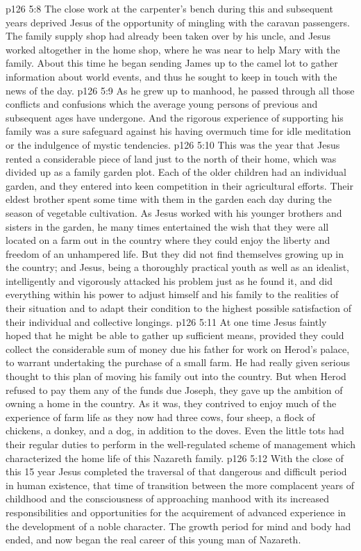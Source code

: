 \vs p126 5:8 The close work at the carpenter’s bench during this and subsequent years deprived Jesus of the opportunity of mingling with the caravan passengers. The family supply shop had already been taken over by his uncle, and Jesus worked altogether in the home shop, where he was near to help Mary with the family. About this time he began sending James up to the camel lot to gather information about world events, and thus he sought to keep in touch with the news of the day.
\vs p126 5:9 As he grew up to manhood, he passed through all those conflicts and confusions which the average young persons of previous and subsequent ages have undergone. And the rigorous experience of supporting his family was a sure safeguard against his having overmuch time for idle meditation or the indulgence of mystic tendencies.
\vs p126 5:10 \pc This was the year that Jesus rented a considerable piece of land just to the north of their home, which was divided up as a family garden plot. Each of the older children had an individual garden, and they entered into keen competition in their agricultural efforts. Their eldest brother spent some time with them in the garden each day during the season of vegetable cultivation. As Jesus worked with his younger brothers and sisters in the garden, he many times entertained the wish that they were all located on a farm out in the country where they could enjoy the liberty and freedom of an unhampered life. But they did not find themselves growing up in the country; and Jesus, being a thoroughly practical youth as well as an idealist, intelligently and vigorously attacked his problem just as he found it, and did everything within his power to adjust himself and his family to the realities of their situation and to adapt their condition to the highest possible satisfaction of their individual and collective longings.
\vs p126 5:11 At one time Jesus faintly hoped that he might be able to gather up sufficient means, provided they could collect the considerable sum of money due his father for work on Herod’s palace, to warrant undertaking the purchase of a small farm. He had really given serious thought to this plan of moving his family out into the country. But when Herod refused to pay them any of the funds due Joseph, they gave up the ambition of owning a home in the country. As it was, they contrived to enjoy much of the experience of farm life as they now had three cows, four sheep, a flock of chickens, a donkey, and a dog, in addition to the doves. Even the little tots had their regular duties to perform in the well\hyp{}regulated scheme of management which characterized the home life of this Nazareth family.
\vs p126 5:12 \pc With the close of this 15 year Jesus completed the traversal of that dangerous and difficult period in human existence, that time of transition between the more complacent years of childhood and the consciousness of approaching manhood with its increased responsibilities and opportunities for the acquirement of advanced experience in the development of a noble character. The growth period for mind and body had ended, and now began the real career of this young man of Nazareth.
\quizlink
